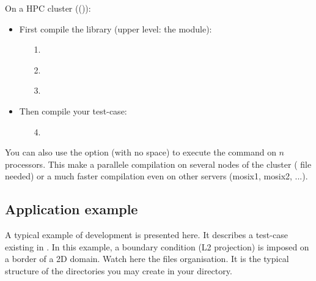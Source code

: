 On a HPC cluster  
(()):
\begin{itemize}
\item First compile the library (upper level: the module):
    \begin{itemize}
    \item[1.] 
    \item[2.] 
    \item[3.] 
    \end{itemize}
\item Then compile your test-case:
    \begin{itemize}
    \item[4.] 
\end{itemize}
\end{itemize}
You can also use the option  (with no space) to
execute the  command on $n$  processors. This make a
parallele compilation on several nodes of the cluster
( file needed) or a much faster compilation even on other servers (mosix1, mosix2, ...).





\subsection{Application example} 

A typical example of development is presented here. It describes a
test-case existing in  
. In this example, a boundary condition (L2 projection) is imposed
on a border of a 2D domain. Watch here the files organisation. It is
the typical structure of the directories you may create  in your
 directory.\\

